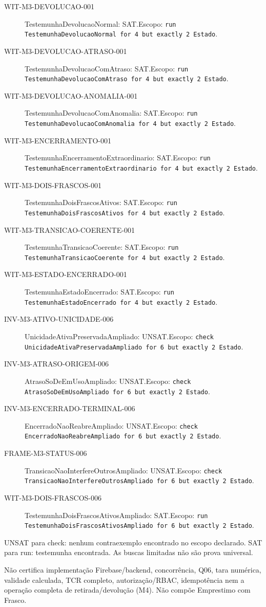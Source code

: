 \begin{description}
\item[WIT-M3-DEVOLUCAO-001] TestemunhaDevolucaoNormal: SAT.\newline Escopo: \texttt{run TestemunhaDevolucaoNormal for 4 but exactly 2 Estado}.
\item[WIT-M3-DEVOLUCAO-ATRASO-001] TestemunhaDevolucaoComAtraso: SAT.\newline Escopo: \texttt{run TestemunhaDevolucaoComAtraso for 4 but exactly 2 Estado}.
\item[WIT-M3-DEVOLUCAO-ANOMALIA-001] TestemunhaDevolucaoComAnomalia: SAT.\newline Escopo: \texttt{run TestemunhaDevolucaoComAnomalia for 4 but exactly 2 Estado}.
\item[WIT-M3-ENCERRAMENTO-001] TestemunhaEncerramentoExtraordinario: SAT.\newline Escopo: \texttt{run TestemunhaEncerramentoExtraordinario for 4 but exactly 2 Estado}.
\item[WIT-M3-DOIS-FRASCOS-001] TestemunhaDoisFrascosAtivos: SAT.\newline Escopo: \texttt{run TestemunhaDoisFrascosAtivos for 4 but exactly 2 Estado}.
\item[WIT-M3-TRANSICAO-COERENTE-001] TestemunhaTransicaoCoerente: SAT.\newline Escopo: \texttt{run TestemunhaTransicaoCoerente for 4 but exactly 2 Estado}.
\item[WIT-M3-ESTADO-ENCERRADO-001] TestemunhaEstadoEncerrado: SAT.\newline Escopo: \texttt{run TestemunhaEstadoEncerrado for 4 but exactly 2 Estado}.
\item[INV-M3-ATIVO-UNICIDADE-006] UnicidadeAtivaPreservadaAmpliado: UNSAT.\newline Escopo: \texttt{check UnicidadeAtivaPreservadaAmpliado for 6 but exactly 2 Estado}.
\item[INV-M3-ATRASO-ORIGEM-006] AtrasoSoDeEmUsoAmpliado: UNSAT.\newline Escopo: \texttt{check AtrasoSoDeEmUsoAmpliado for 6 but exactly 2 Estado}.
\item[INV-M3-ENCERRADO-TERMINAL-006] EncerradoNaoReabreAmpliado: UNSAT.\newline Escopo: \texttt{check EncerradoNaoReabreAmpliado for 6 but exactly 2 Estado}.
\item[FRAME-M3-STATUS-006] TransicaoNaoInterfereOutrosAmpliado: UNSAT.\newline Escopo: \texttt{check TransicaoNaoInterfereOutrosAmpliado for 6 but exactly 2 Estado}.
\item[WIT-M3-DOIS-FRASCOS-006] TestemunhaDoisFrascosAtivosAmpliado: SAT.\newline Escopo: \texttt{run TestemunhaDoisFrascosAtivosAmpliado for 6 but exactly 2 Estado}.
\end{description}
UNSAT para check: nenhum contraexemplo encontrado no escopo declarado. SAT para run: testemunha encontrada. As buscas limitadas não são prova universal.

Não certifica implementação Firebase/backend, concorrência, Q06, tara numérica, validade calculada, TCR completo, autorização/RBAC, idempotência nem a operação completa de retirada/devolução (M4). Não compõe Emprestimo com Frasco.
